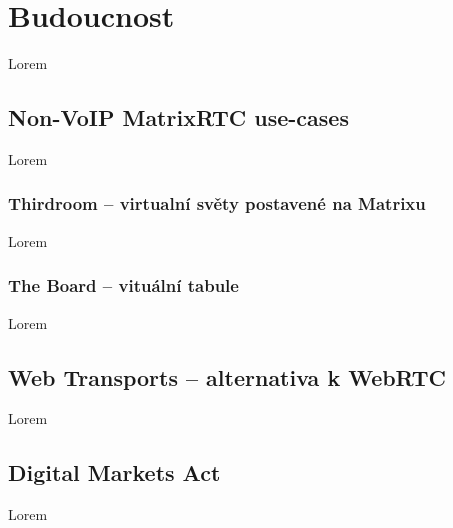\section{Budoucnost}

Lorem

\subsection{Non-VoIP MatrixRTC use-cases}

Lorem

\subsubsection{Thirdroom -- virtualní světy postavené na Matrixu}\label{thirdroom}

Lorem

\subsubsection{The Board -- vituální tabule}

Lorem

\subsection{Web Transports -- alternativa k WebRTC}

Lorem

\subsection{Digital Markets Act}

Lorem
